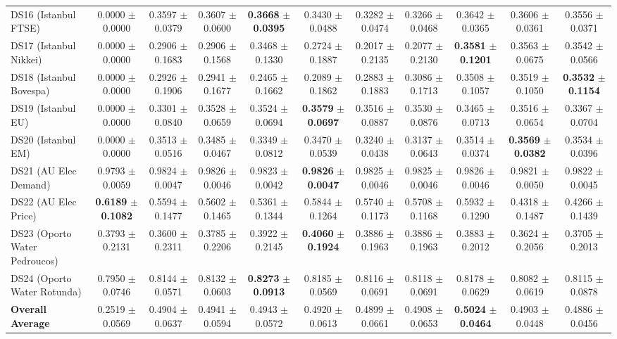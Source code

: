 \begin{table}[t]
{{\begin{tabular}{lcccccccccc}
DS16 (Istanbul FTSE) & 0.0000 $\pm$ 0.0000 & 0.3597 $\pm$ 0.0379 & 0.3607 $\pm$ 0.0600 & \textbf{0.3668} $\pm$ \textbf{0.0395} & 0.3430 $\pm$ 0.0488 & 0.3282 $\pm$ 0.0474 & 0.3266 $\pm$ 0.0468 & 0.3642 $\pm$ 0.0365 & 0.3606 $\pm$ 0.0361 & 0.3556 $\pm$ 0.0371 \\
DS17 (Istanbul Nikkei) & 0.0000 $\pm$ 0.0000 & 0.2906 $\pm$ 0.1683 & 0.2906 $\pm$ 0.1568 & 0.3468 $\pm$ 0.1330 & 0.2724 $\pm$ 0.1887 & 0.2017 $\pm$ 0.2135 & 0.2077 $\pm$ 0.2130 & \textbf{0.3581} $\pm$ \textbf{0.1201} & 0.3563 $\pm$ 0.0675 & 0.3542 $\pm$ 0.0566 \\
DS18 (Istanbul Bovespa) & 0.0000 $\pm$ 0.0000 & 0.2926 $\pm$ 0.1906 & 0.2941 $\pm$ 0.1677 & 0.2465 $\pm$ 0.1662 & 0.2089 $\pm$ 0.1862 & 0.2883 $\pm$ 0.1883 & 0.3086 $\pm$ 0.1713 & 0.3508 $\pm$ 0.1057 & 0.3519 $\pm$ 0.1050 & \textbf{0.3532} $\pm$ \textbf{0.1154} \\
DS19 (Istanbul EU) & 0.0000 $\pm$ 0.0000 & 0.3301 $\pm$ 0.0840 & 0.3528 $\pm$ 0.0659 & 0.3524 $\pm$ 0.0694 & \textbf{0.3579} $\pm$ \textbf{0.0697} & 0.3516 $\pm$ 0.0887 & 0.3530 $\pm$ 0.0876 & 0.3465 $\pm$ 0.0713 & 0.3516 $\pm$ 0.0654 & 0.3367 $\pm$ 0.0704 \\
DS20 (Istanbul EM) & 0.0000 $\pm$ 0.0000 & 0.3513 $\pm$ 0.0516 & 0.3485 $\pm$ 0.0467 & 0.3349 $\pm$ 0.0812 & 0.3470 $\pm$ 0.0539 & 0.3240 $\pm$ 0.0438 & 0.3137 $\pm$ 0.0643 & 0.3514 $\pm$ 0.0374 & \textbf{0.3569} $\pm$ \textbf{0.0382} & 0.3534 $\pm$ 0.0396 \\
DS21 (AU Elec Demand) & 0.9793 $\pm$ 0.0059 & 0.9824 $\pm$ 0.0047 & 0.9826 $\pm$ 0.0046 & 0.9823 $\pm$ 0.0042 & \textbf{0.9826} $\pm$ \textbf{0.0047} & 0.9825 $\pm$ 0.0046 & 0.9825 $\pm$ 0.0046 & 0.9826 $\pm$ 0.0046 & 0.9821 $\pm$ 0.0050 & 0.9822 $\pm$ 0.0045 \\
DS22 (AU Elec Price) & \textbf{0.6189} $\pm$ \textbf{0.1082} & 0.5594 $\pm$ 0.1477 & 0.5602 $\pm$ 0.1465 & 0.5361 $\pm$ 0.1344 & 0.5844 $\pm$ 0.1264 & 0.5740 $\pm$ 0.1173 & 0.5708 $\pm$ 0.1168 & 0.5932 $\pm$ 0.1290 & 0.4318 $\pm$ 0.1487 & 0.4266 $\pm$ 0.1439 \\
DS23 (Oporto Water Pedroucos) & 0.3793 $\pm$ 0.2131 & 0.3600 $\pm$ 0.2311 & 0.3785 $\pm$ 0.2206 & 0.3922 $\pm$ 0.2145 & \textbf{0.4060} $\pm$ \textbf{0.1924} & 0.3886 $\pm$ 0.1963 & 0.3886 $\pm$ 0.1963 & 0.3883 $\pm$ 0.2012 & 0.3624 $\pm$ 0.2056 & 0.3705 $\pm$ 0.2013 \\
DS24 (Oporto Water Rotunda) & 0.7950 $\pm$ 0.0746 & 0.8144 $\pm$ 0.0571 & 0.8132 $\pm$ 0.0603 & \textbf{0.8273} $\pm$ \textbf{0.0913} & 0.8185 $\pm$ 0.0569 & 0.8116 $\pm$ 0.0691 & 0.8118 $\pm$ 0.0691 & 0.8178 $\pm$ 0.0629 & 0.8082 $\pm$ 0.0619 & 0.8115 $\pm$ 0.0878 \\
\midrule
\textbf{Overall Average} & 0.2519 $\pm$ 0.0569 & 0.4904 $\pm$ 0.0637 & 0.4941 $\pm$ 0.0594 & 0.4943 $\pm$ 0.0572 & 0.4920 $\pm$ 0.0613 & 0.4899 $\pm$ 0.0661 & 0.4908 $\pm$ 0.0653 & \textbf{0.5024} $\pm$ \textbf{0.0464} & 0.4903 $\pm$ 0.0448 & 0.4886 $\pm$ 0.0456 \\
\bottomrule
\end{tabular}%
}%
}
\end{table}
